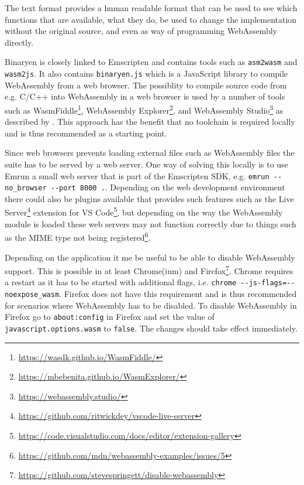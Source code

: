 The text format provides a human readable format that can be used to see which functions that are available, what they do, be used to change the implementation without the original source, and even as way of programming WebAssembly directly.


Binaryen is closely linked to Emscripten and contains tools such as \texttt{asm2wasm} and \texttt{wasm2js}. It also contains \texttt{binaryen.js} which is a JavaScript library to compile WebAssembly from a web browser. The possiblity to compile source code from e.g. C/C++ into WebAssembly in a web browser is used by a number of tools such as WasmFiddle\footnote{\url{https://wasdk.github.io/WasmFiddle/}}, WebAssembly Explorer\footnote{\url{https://mbebenita.github.io/WasmExplorer/}}, and WebAssembly Studio\footnote{\url{https://webassembly.studio/}} as described by \textcite{Rourke2018}. This approach has the benefit that no toolchain is required locally and is thus recommended as a starting point.

Since web browsers prevents loading external files such as WebAssembly files the suite has to be served by a web server. One way of solving this locally is to use Emrun a small web server that is part of the Emscripten SDK, e.g. \verb|emrun --no_browser --port 8000 .|. Depending on the web development environment there could also be plugins available that provides such features such as the Live Server\footnote{\url{https://github.com/ritwickdey/vscode-live-server}} extension for VS Code\footnote{\url{https://code.visualstudio.com/docs/editor/extension-gallery}}, but depending on the way the WebAssembly module is loaded these web servers may not function correctly due to things such as the MIME type not being registered\footnote{\url{https://github.com/mdn/webassembly-examples/issues/5}}.

Depending on the application it me be useful to be able to disable WebAssembly support. This is possible in at least Chrome(ium) and Firefox\footnote{\url{https://github.com/stevespringett/disable-webassembly}}. Chrome requires a restart as it has to be started with additional flags, i.e. \verb|chrome --js-flags=--noexpose_wasm|. Firefox does not have this requirement and is thus recommended for scenarios where WebAssembly has to be disabled. To disable WebAssembly in Firefox go to \verb|about:config| in Firefox and set the value of \verb|javascript.options.wasm| to \verb|false|. The changes should take effect immediately.

